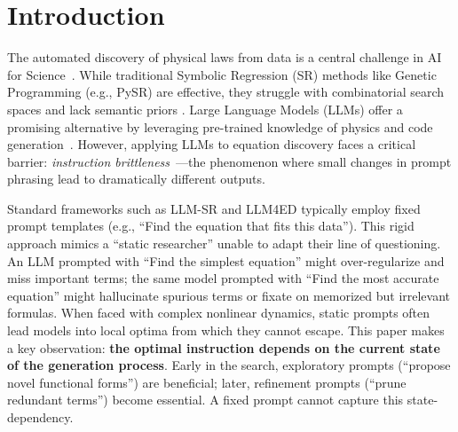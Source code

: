 \section{Introduction}

The automated discovery of physical laws from data is a central challenge in AI for Science~\citep{wang2023scientific,raghu2020survey}. While traditional Symbolic Regression (SR) methods like Genetic Programming (e.g., PySR) are effective, they struggle with combinatorial search spaces and lack semantic priors \cite{cranmer2020discovering}. Large Language Models (LLMs) offer a promising alternative by leveraging pre-trained knowledge of physics and code generation~\citep{chen2021evaluating,wei2022chain}. However, applying LLMs to equation discovery faces a critical barrier: \textit{instruction brittleness}~\citep{sclar2024quantifying,mizrahi2024state}---the phenomenon where small changes in prompt phrasing lead to dramatically different outputs.

Standard frameworks such as LLM-SR \citep{shojaee2024llmsr} and LLM4ED \citep{du2024llm4ed} typically employ fixed prompt templates (e.g., ``Find the equation that fits this data''). This rigid approach mimics a ``static researcher'' unable to adapt their line of questioning. An LLM prompted with ``Find the simplest equation'' might over-regularize and miss important terms; the same model prompted with ``Find the most accurate equation'' might hallucinate spurious terms or fixate on memorized but irrelevant formulas. When faced with complex nonlinear dynamics, static prompts often lead models into local optima from which they cannot escape. This paper makes a key observation: \textbf{the optimal instruction depends on the current state of the generation process}. Early in the search, exploratory prompts (``propose novel functional forms'') are beneficial; later, refinement prompts (``prune redundant terms'') become essential. A fixed prompt cannot capture this state-dependency. 

